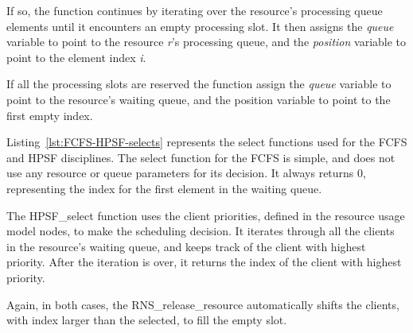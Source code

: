 If so, the function continues by iterating over the resource's processing queue elements until it encounters an empty processing slot. It then assigns the \emph{queue} variable to point to the resource \emph{r}'s processing queue, and the \emph{position} variable to point to the element index \emph{i}.

If all the processing slots are reserved the function assign the \emph{queue} variable to point to the resource's waiting queue, and the position variable to point to the first empty index.



Listing~\ref{lst:FCFS-HPSF-selects} represents the select functions used for the FCFS and HPSF disciplines. The select function for the FCFS is simple, and does not use any resource or queue parameters for its decision. It always returns 0, representing the index for the first element in the waiting queue.

The HPSF\_select function uses the client priorities, defined in the resource usage model nodes, to make the scheduling decision. It iterates through all the clients in the resource's waiting queue, and keeps track of the client with highest priority. After the iteration is over, it returns the index of the client with highest priority.

Again, in both cases, the RNS\_release\_resource automatically shifts the clients, with index larger than the selected, to fill the empty slot.





